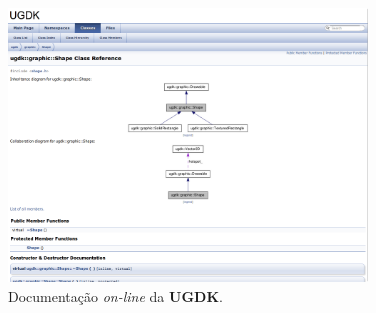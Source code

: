 \documentclass[12pt,onecolumn,a4paper]{article}
\begin{document}
        \begin{figure}[htb]
            \centering
            \includegraphics[width=0.85\textwidth]{images/site_05.png}
            \caption{Documentação \textit{on-line} da \textbf{UGDK}.}
            \label{fig:site_05}
        \end{figure}
    
        
        
    
    
        
    
    
        
        
    
\end{document}
